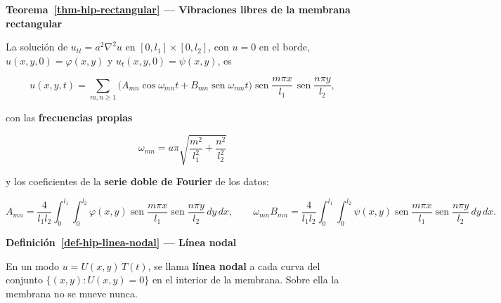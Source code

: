 \documentclass[
  spanish,
  a4paper,
]{scrbook}
\theoremstyle{definition}
\theoremstyle{plain}
\theoremstyle{definition}
\theoremstyle{plain}
\theoremstyle{definition}
\theoremstyle{remark}
\begin{document}
\begin{tcolorbox}[enhanced jigsaw, arc=.35mm, bottomrule=.15mm, breakable, colback=white, colframe=quarto-callout-note-color-frame, left=2mm, leftrule=.75mm, opacityback=0, rightrule=.15mm, toprule=.15mm]
\begin{minipage}[t]{5.5mm}
\textcolor{quarto-callout-note-color}{\faInfo}
\end{minipage}%
\begin{minipage}[t]{\textwidth - 5.5mm}

\vspace{-3mm}\textbf{Teorema~\ref{thm-hip-rectangular} --- Vibraciones libres de la membrana
rectangular}\vspace{3mm}

La solución de \(u_{tt} = a^2\nabla^2u\) en \([0,l_1]\times[0,l_2]\),
con \(u=0\) en el borde, \(u(x,y,0) = \varphi(x,y)\) y
\(u_t(x,y,0) = \psi(x,y)\), es

\[
u(x,y,t) = \sum_{m,n\ge1}\big(A_{mn}\cos\omega_{mn}t + B_{mn}\operatorname{sen}\omega_{mn}t\big)
\operatorname{sen}\frac{m\pi x}{l_1}\,\operatorname{sen}\frac{n\pi y}{l_2},
\]

con las \textbf{frecuencias propias}

\[
\omega_{mn} = a\pi\sqrt{\frac{m^2}{l_1^2} + \frac{n^2}{l_2^2}}
\]

y los coeficientes de la \textbf{serie doble de Fourier} de los datos:

\[
A_{mn} = \frac{4}{l_1l_2}\int_0^{l_1}\!\!\int_0^{l_2}\varphi(x,y)\operatorname{sen}\frac{m\pi x}{l_1}\operatorname{sen}\frac{n\pi y}{l_2}\,dy\,dx,
\qquad
\omega_{mn}B_{mn} = \frac{4}{l_1l_2}\int_0^{l_1}\!\!\int_0^{l_2}\psi(x,y)\operatorname{sen}\frac{m\pi x}{l_1}\operatorname{sen}\frac{n\pi y}{l_2}\,dy\,dx .
\]

\end{minipage}%
\end{tcolorbox}

\begin{tcolorbox}[enhanced jigsaw, arc=.35mm, bottomrule=.15mm, breakable, colback=white, colframe=quarto-callout-note-color-frame, left=2mm, leftrule=.75mm, opacityback=0, rightrule=.15mm, toprule=.15mm]
\begin{minipage}[t]{5.5mm}
\textcolor{quarto-callout-note-color}{\faInfo}
\end{minipage}%
\begin{minipage}[t]{\textwidth - 5.5mm}

\vspace{-3mm}\textbf{Definición~\ref{def-hip-linea-nodal} --- Línea nodal}\vspace{3mm}

En un modo \(u = U(x,y)\,T(t)\), se llama \textbf{línea nodal} a cada
curva del conjunto \(\{(x,y): U(x,y) = 0\}\) en el interior de la
membrana. Sobre ella la membrana no se mueve nunca.

\end{minipage}%
\end{tcolorbox}
\end{document}
